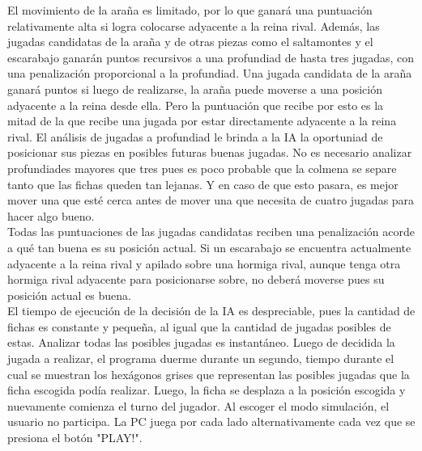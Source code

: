 \documentclass[a4paper,12pt]{article}
\begin{document}
El movimiento de la araña es limitado, por lo que ganará una puntuación relativamente alta si logra colocarse adyacente a la reina rival. Además, las jugadas candidatas de la araña y de otras piezas como el saltamontes y el escarabajo ganarán puntos recursivos a una profundiad de hasta tres jugadas, con una penalización proporcional a la profundiad. Una jugada candidata de la araña ganará puntos si luego de realizarse, la araña puede moverse a una posición adyacente a la reina desde ella. Pero la puntuación que recibe por esto es la mitad de la que recibe una jugada por estar directamente adyacente a la reina rival. El análisis de jugadas a profundiad le brinda a la IA la oportuniad de posicionar sus piezas en posibles futuras buenas jugadas. No es necesario analizar profundiades mayores que tres pues es poco probable que la colmena se separe tanto que las fichas queden tan lejanas. Y en caso de que esto pasara, es mejor mover una que esté cerca antes de mover una que necesita de cuatro jugadas para hacer algo bueno.\\
Todas las puntuaciones de las jugadas candidatas reciben una penalización acorde a qué tan buena es su posición actual. Si un escarabajo se encuentra actualmente adyacente a la reina rival y apilado sobre una hormiga rival, aunque tenga otra hormiga rival adyacente para posicionarse sobre, no deberá moverse pues su posición actual es buena.\\
El tiempo de ejecución de la decisión de la IA es despreciable, pues la cantidad de fichas es constante y pequeña, al igual que la cantidad de jugadas posibles de estas. Analizar todas las posibles jugadas es instantáneo. Luego de decidida la jugada a realizar, el programa duerme durante un segundo, tiempo durante el cual se muestran los hexágonos grises que representan las posibles jugadas que la ficha escogida podía realizar. Luego, la ficha se desplaza a la posición escogida y nuevamente comienza el turno del jugador.
Al escoger el modo simulación, el usuario no participa. La PC juega por cada lado alternativamente cada vez que se presiona el botón "PLAY!".
\end{document}
